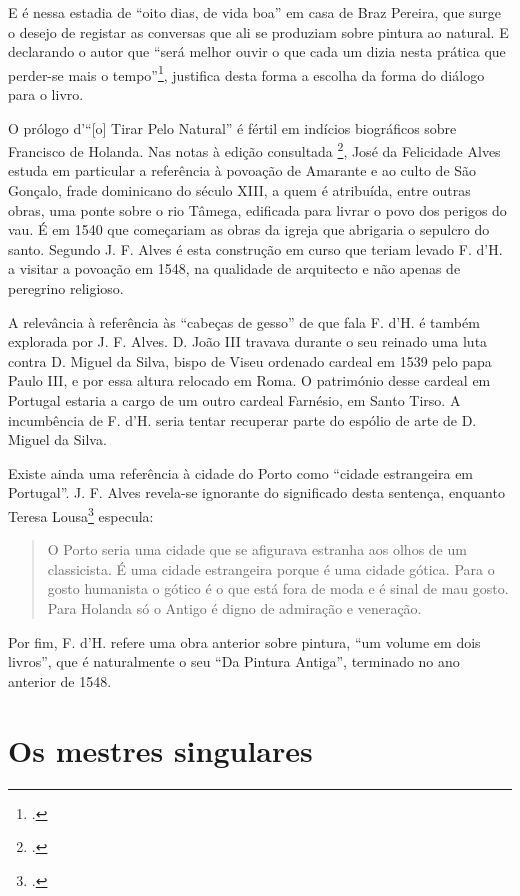 \documentclass{article}
\begin{document}
E é nessa estadia de ``oito dias, de vida boa'' em casa de Braz
Pereira, que surge o desejo de registar as conversas que ali se
produziam sobre pintura ao natural. E declarando o autor que ``será
melhor ouvir o que cada um dizia nesta prática que perder-se mais o
tempo''\footcite[p12]{holanda}, justifica desta forma a escolha da forma
do diálogo para o livro.

O prólogo d'``[o] Tirar Pelo Natural'' é fértil em indícios
biográficos sobre Francisco de Holanda. Nas notas à edição consultada
\footcite{holanda}, José da Felicidade Alves estuda em particular a
referência à povoação de Amarante e ao culto de São Gonçalo, frade
dominicano do século XIII, a quem é atribuída, entre outras obras, uma
ponte sobre o rio Tâmega, edificada para livrar o povo dos perigos do
vau. É em 1540 que começariam as obras da igreja que abrigaria o
sepulcro do santo. Segundo J. F. Alves é esta construção em curso que
teriam levado F. d'H. a visitar a povoação em 1548, na qualidade de
arquitecto e não apenas de peregrino religioso.

A relevância à referência às ``cabeças de gesso'' de que fala
F. d'H. é também explorada por J. F. Alves. D. João III travava
durante o seu reinado uma luta contra D. Miguel da Silva, bispo de
Viseu ordenado cardeal em 1539 pelo papa Paulo III, e por essa altura
relocado em Roma. O património desse cardeal em Portugal estaria a
cargo de um outro cardeal Farnésio, em Santo Tirso. A incumbência de
F. d'H. seria tentar recuperar parte do espólio de arte de D. Miguel
da Silva.

Existe ainda uma referência à cidade do Porto como ``cidade
estrangeira em Portugal''. J. F. Alves revela-se ignorante do
significado desta sentença, enquanto Teresa Lousa\footcite{teresa-desenho}
especula:

\begin{quote}
 O Porto seria uma cidade que se afigurava estranha aos olhos de um
 classicista. É uma cidade estrangeira porque é uma cidade
 gótica. Para o gosto humanista o gótico é o que está fora de moda e é
 sinal de mau gosto.  Para Holanda só o Antigo é digno de admiração e
 veneração.
\end{quote}

Por fim, F. d'H. refere uma obra anterior sobre pintura, ``um volume
em dois livros'', que é naturalmente o seu ``Da Pintura Antiga'',
terminado no ano anterior de 1548.

\section{Os mestres singulares}
\end{document}
